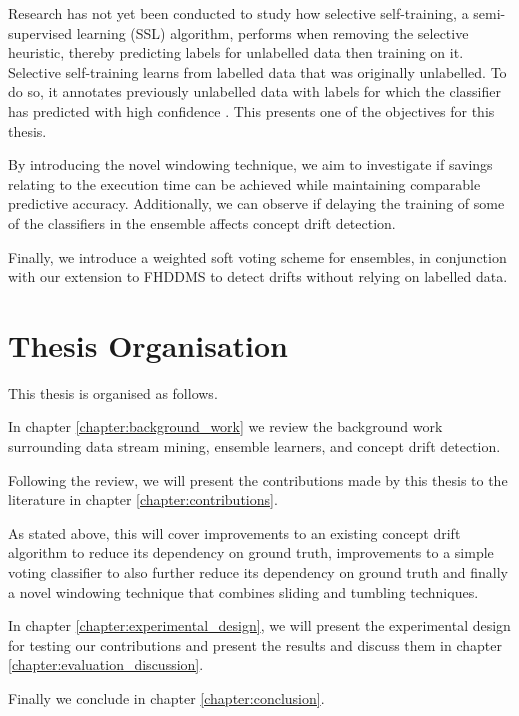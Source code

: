 Research has not yet been conducted to study how selective self-training, a semi-supervised learning (SSL) algorithm, performs when removing the selective heuristic, thereby predicting labels for unlabelled data then training on it. Selective self-training learns from labelled data that was originally unlabelled. To do so, it annotates previously unlabelled data with labels for which the classifier has predicted with high confidence \cite{zhu2009selftraining}. This presents one of the objectives for this thesis.

By introducing the novel windowing technique, we aim to investigate if savings relating to the execution time can be achieved while maintaining comparable predictive accuracy. Additionally, we can observe if delaying the training of some of the classifiers in the ensemble affects concept drift detection.

Finally, we introduce a weighted soft voting scheme for ensembles, in conjunction with our extension to FHDDMS to detect drifts without relying on labelled data.


\section{Thesis Organisation}
This thesis is organised as follows.

In chapter \ref{chapter:background_work} we review the background work surrounding data stream mining, ensemble learners, and concept drift detection.

Following the review, we will present the contributions made by this thesis to the literature in chapter \ref{chapter:contributions}.

As stated above, this will cover improvements to an existing concept drift algorithm to reduce its dependency on ground truth, improvements to a simple voting classifier to also further reduce its dependency on ground truth and finally a novel windowing technique that combines sliding and tumbling techniques.

In chapter \ref{chapter:experimental_design}, we will present the experimental design for testing our contributions and present the results and discuss them in chapter \ref{chapter:evaluation_discussion}.

Finally we conclude in chapter \ref{chapter:conclusion}.